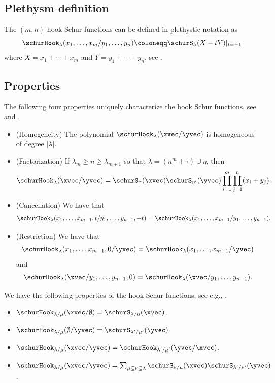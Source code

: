 \subsection[hookSchurPlethDef]{Plethysm definition}

The $(m,n)$-hook Schur functions can be
defined in \hyperref[plethysm]{plethystic notation} as
\[
\schurHook_\lambda(x_1,\dotsc,x_m/y_1,\dotsc,y_n) \coloneqq
\schurS_\lambda(X - t Y) \vert_{t=-1}
\]
where $X= x_1+\dotsb+x_m$ and $Y= y_1+\dotsb+y_n$, see
\cite[Eq.~(55)]{YangRemmel1998}.



\subsection[schurHookProperties]{Properties}

The following four properties uniquely characterize the hook Schur functions,
see \cite{Macdonald1995} and \cite{MoensJeugt2003}.

\begin{itemize}

\item
(Homogeneity)
The polynomial $\schurHook_{\lambda}(\xvec/\yvec)$ is homogeneous of degree
$|\lambda|$.

\item
(Factorization) If $\lambda_m\geq n \geq \lambda_{m+1}$
so that $\lambda = (n^m + \tau)\cup \eta$, then
\[
\schurHook_{\lambda}(\xvec/\yvec) =
\schurS_{\tau}(\xvec)\schurS_{\eta'}(\yvec)
\prod_{i=1}^m\prod_{j=1}^n (x_i+y_j).
\]

\item
(Cancellation) We have that
\[
\schurHook_{\lambda}(x_1,\dotsc,x_{m-1},t/y_1,\dotsc,y_{n-1},-t)
=\schurHook_{\lambda}(x_1,\dotsc,x_{m-1}/y_1,\dotsc,y_{n-1}).
\]

\item
(Restriction) We have that
\[
\schurHook_{\lambda}(x_1,\dotsc,x_{m-1},0/\yvec)
=\schurHook_{\lambda}(x_1,\dotsc,x_{m-1}/\yvec)
\]
and
\[
\schurHook_{\lambda}(\xvec/y_1,\dotsc,y_{n-1},0)
=\schurHook_{\lambda}(\xvec/y_1,\dotsc,y_{n-1}).
\]
\end{itemize}

We have the following properties of the hook Schur functions,
see e.g., \cite{YangRemmel1998}.

\begin{itemize}
\item
$\schurHook_{\lambda/\mu}(\xvec/\emptyset) = \schurS_{\lambda/\mu}(\xvec)$.

\item
$\schurHook_{\lambda/\mu}(\emptyset/\yvec) = \schurS_{\lambda'/\mu'}(\yvec)$.

\item
$\schurHook_{\lambda/\mu}(\xvec/\yvec) = \schurHook_{\lambda'/\mu'}(\yvec/\xvec)$.

\item
$\schurHook_{\lambda/\mu}(\xvec/\yvec) =
\sum_{\mu \subseteq \nu \subseteq \lambda}
\schurS_{\nu/\mu}(\xvec) \schurS_{\lambda'/\nu'}(\yvec)$.
\end{itemize}

